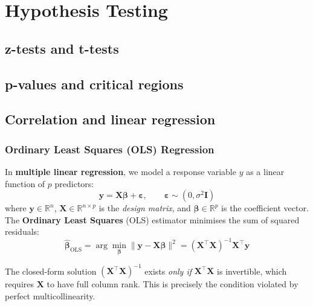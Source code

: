 
\section{Hypothesis Testing}

\subsection{z-tests and t-tests}


\subsection{p-values and critical regions}


\subsection{Correlation and linear regression}

\subsubsection*{Ordinary Least Squares (OLS) Regression}

\begin{definition}
In \textbf{multiple linear regression}, we model a response variable $y$ as a linear function of $p$ predictors:
\[
\mathbf{y} = \mathbf{X}\boldsymbol{\beta} + \boldsymbol{\varepsilon}, \qquad \boldsymbol{\varepsilon} \sim (0, \sigma^2 \mathbf{I})
\]
where $\mathbf{y} \in \mathbb{R}^n$, $\mathbf{X} \in \mathbb{R}^{n \times p}$ is the \emph{design matrix}, and $\boldsymbol{\beta} \in \mathbb{R}^p$ is the coefficient vector. The \textbf{Ordinary Least Squares} (OLS) estimator minimises the sum of squared residuals:
\[
\hat{\boldsymbol{\beta}}_{\mathrm{OLS}} = \arg\min_{\boldsymbol{\beta}} \|\mathbf{y} - \mathbf{X}\boldsymbol{\beta}\|^2 = (\mathbf{X}^\top \mathbf{X})^{-1}\mathbf{X}^\top \mathbf{y}
\]
\end{definition}

\begin{remark}
The closed-form solution $(\mathbf{X}^\top \mathbf{X})^{-1}$ exists \emph{only if} $\mathbf{X}^\top\mathbf{X}$ is invertible, which requires $\mathbf{X}$ to have full column rank. This is precisely the condition violated by perfect multicollinearity.
\end{remark}

